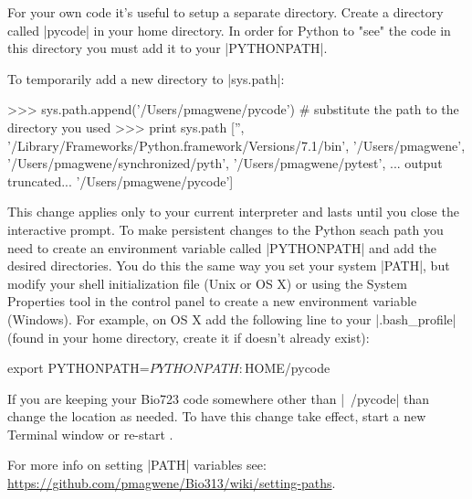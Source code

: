 For your own code it's useful to setup a separate directory. Create a directory called |pycode| in your home directory. In order for Python to "see" the code in this directory you must add it to your |PYTHONPATH|.

To temporarily add a new directory to |sys.path|:
\begin{python}
>>> sys.path.append('/Users/pmagwene/pycode') # substitute the path to the directory you used
>>> print sys.path
['', '/Library/Frameworks/Python.framework/Versions/7.1/bin', '/Users/pmagwene', 
'/Users/pmagwene/synchronized/pyth', '/Users/pmagwene/pytest', 
... output truncated...
'/Users/pmagwene/pycode']
\end{python}

This change applies only to your current interpreter and lasts until you close the interactive prompt. To make persistent changes to the Python seach path you need to create an environment variable called |PYTHONPATH| and add the desired directories.  You do this the same way you set your system |PATH|, but modify your shell initialization file (Unix or OS X) or using the System Properties tool in the control panel to create a new environment variable (Windows). For example, on OS X add the following line to your |.bash_profile| (found in your home directory, create it if doesn't already exist):
%
\begin{bash}
export PYTHONPATH=$PYTHONPATH:$HOME/pycode   
\end{bash}
%
If you are keeping your Bio723 code somewhere other than |~/pycode| than change the location as needed. To have this change take effect, start a new Terminal window or re-start \ipy.

For more info on setting |PATH| variables see: \url{https://github.com/pmagwene/Bio313/wiki/setting-paths}.
